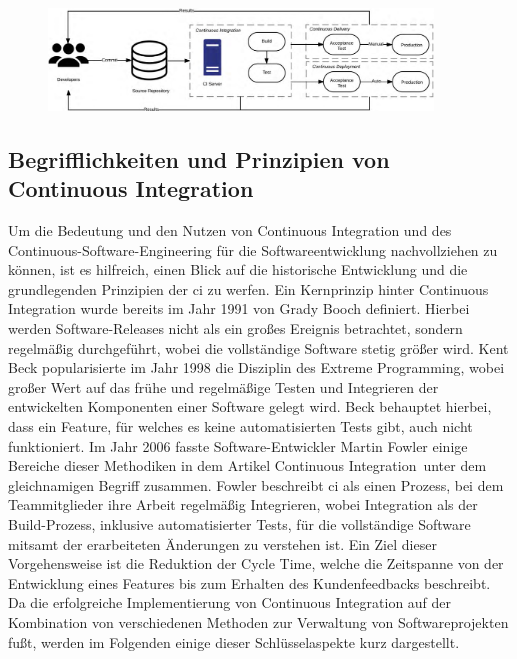 \begin{figure}[H]
    \centering
    \includegraphics[width=0.91\textwidth]{images/content/ci-cde-cd}
    \label{fig:ci-cde-cd}
\end{figure}

\subsection{Begrifflichkeiten und Prinzipien von Continuous Integration} \label{subsec:02-background-2}

Um die Bedeutung und den Nutzen von Continuous Integration und des Continuous-Software-Engineering für die
Softwareentwicklung nachvollziehen zu können, ist es hilfreich, einen Blick auf die historische Entwicklung und die
grundlegenden Prinzipien der \acrshort{ci} zu werfen.
Ein Kernprinzip hinter Continuous Integration wurde bereits im Jahr 1991 von Grady Booch definiert.
Hierbei werden Software-Releases nicht als ein großes Ereignis betrachtet, sondern regelmäßig durchgeführt, wobei
die vollständige Software stetig größer wird.
Kent Beck popularisierte im Jahr 1998 die Disziplin des \glqq Extreme Programming\grqq, wobei großer Wert auf das frühe
und regelmäßige Testen und Integrieren der entwickelten Komponenten einer Software gelegt wird.
Beck behauptet hierbei, dass ein Feature, für welches es keine automatisierten Tests gibt, auch nicht funktioniert.
Im Jahr 2006 fasste Software-Entwickler Martin Fowler einige Bereiche dieser Methodiken in dem Artikel
\glqq Continuous Integration\grqq\ unter dem gleichnamigen Begriff zusammen.
Fowler beschreibt \acrshort{ci} als einen Prozess, bei dem Teammitglieder ihre Arbeit regelmäßig Integrieren,
wobei Integration als der Build-Prozess, inklusive automatisierter Tests, für die vollständige Software mitsamt der
erarbeiteten Änderungen zu verstehen ist.
Ein Ziel dieser Vorgehensweise ist die Reduktion der \glqq Cycle Time\grqq, welche die Zeitspanne von der Entwicklung
eines Features bis zum Erhalten des Kundenfeedbacks beschreibt.
Da die erfolgreiche Implementierung von Continuous Integration auf der Kombination von verschiedenen Methoden zur
Verwaltung von Softwareprojekten fußt, werden im Folgenden einige dieser Schlüsselaspekte kurz dargestellt.


